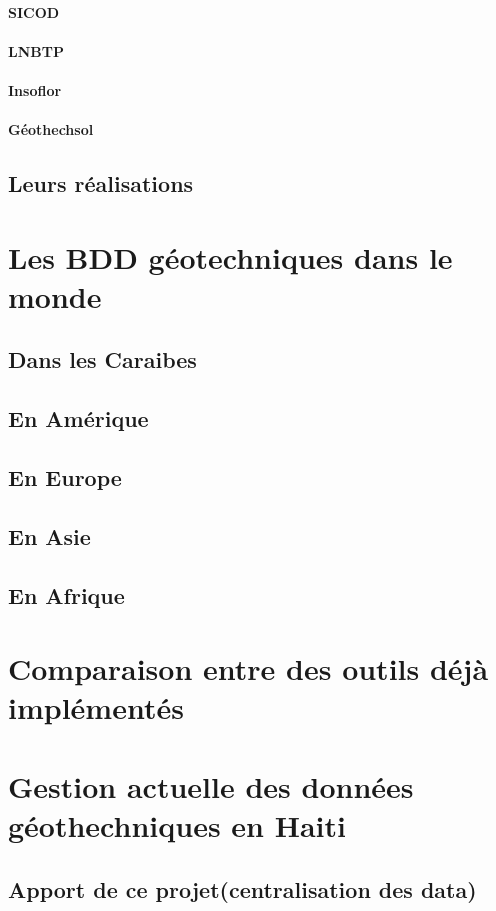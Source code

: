         \paragraph{SICOD}
        \paragraph{LNBTP}
        \paragraph{Insoflor}
        \paragraph{Géothechsol}
        \subsection{Leurs réalisations}
        \lipsum[1]
        \section{Les BDD géotechniques dans le monde}
        \subsection{Dans les Caraibes}
        \lipsum[1]
        \subsection{En Amérique}
        \lipsum[1]
        \subsection{En Europe}
        \lipsum[1]
        \subsection{En Asie}
        \lipsum[1]
        \subsection{En Afrique}
        \lipsum[1]
    \section{Comparaison entre des outils déjà implémentés}
    \lipsum[1]
    \section{Gestion actuelle des données géothechniques en Haiti}
    \lipsum[1]
    \subsection{Apport de ce projet(centralisation des data)}
        \lipsum[1]
